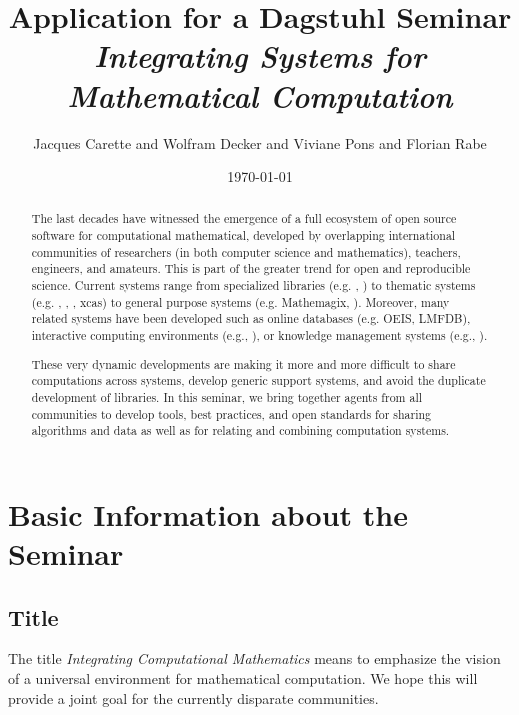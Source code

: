 \documentclass[a4paper,11pt]{article}
\title{Application for a Dagstuhl Seminar \\ \emph{Integrating Systems for Mathematical Computation}}
\author{Jacques Carette and Wolfram Decker and Viviane Pons and Florian Rabe}
\date{\today}
\begin{document}
\maketitle

\begin{abstract}
The last decades have witnessed the emergence of a full ecosystem of open source software for computational mathematical, developed by overlapping international communities of researchers (in both computer science and mathematics), teachers, engineers, and amateurs.
This is part of the greater trend for open and reproducible science.
Current systems range from specialized libraries (e.g. \MPIR, \Linbox) to thematic systems (e.g. \GAP, \Pari, \Singular, xcas) to general purpose systems (e.g. Mathemagix, \Sage).
Moreover, many related systems have been developed such as online databases (e.g. OEIS, LMFDB), interactive computing environments (e.g., \Jupyter), or knowledge management systems (e.g., \MathHub).

These very dynamic developments are making it more and more difficult to share computations across systems, develop generic support systems, and avoid the duplicate development of libraries.
In this seminar, we bring together agents from all communities to develop tools, best practices, and open standards for sharing algorithms and data as well as for relating and combining computation systems.
\end{abstract}


\tableofcontents

\newpage

\section{Basic Information about the Seminar}

\subsection{Title}

The title \emph{Integrating Computational Mathematics} means to emphasize the vision of a universal environment for mathematical computation.
We hope this will provide a joint goal for the currently disparate communities.

\end{document}
